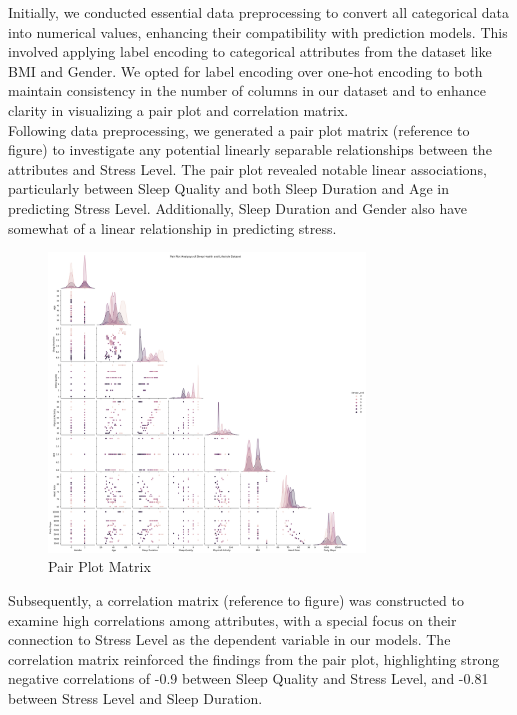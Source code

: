 \documentclass[11pt, letterpaper]{article}
\begin{document}
    \noindent Initially, we conducted essential data preprocessing to convert all categorical data into numerical values, enhancing their compatibility with prediction models. This involved applying label encoding to categorical attributes from the dataset like BMI and Gender. We opted for label encoding over one-hot encoding to both maintain consistency in the number of columns in our dataset and to enhance clarity in visualizing a pair plot and correlation matrix.\\
    
    \noindent Following data preprocessing, we generated a pair plot matrix (reference to figure) to investigate any potential linearly separable relationships between the attributes and Stress Level. The pair plot revealed notable linear associations, particularly between Sleep Quality and both Sleep Duration and Age in predicting Stress Level. Additionally, Sleep Duration and Gender also have somewhat of a linear relationship in predicting stress.\\
    
    \begin{figure}[H]
        \centering
        \includegraphics[width=0.75\textwidth]{pairplot.png}
        \caption{Pair Plot Matrix}
        \label{fig:pairplot}
    \end{figure}

    \noindent Subsequently, a correlation matrix (reference to figure) was constructed to examine high correlations among attributes, with a special focus on their connection to Stress Level as the dependent variable in our models. The correlation matrix reinforced the findings from the pair plot, highlighting strong negative correlations of -0.9 between Sleep Quality and Stress Level, and -0.81 between Stress Level and Sleep Duration.
    
\end{document}
